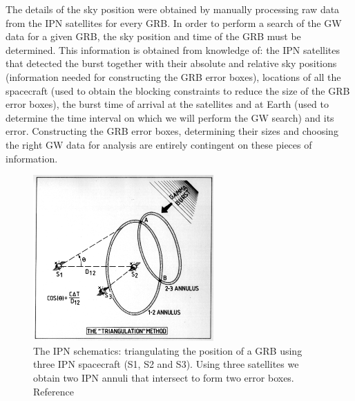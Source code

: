 \documentclass[a4paper]{jpconf}
\begin{document}
The details of the sky position were obtained by manually processing raw data from the IPN satellites for every GRB.  In order to perform a search of the GW data for a given GRB, the sky position and time of the GRB must be determined.  This information is obtained from knowledge of: the IPN satellites that detected the burst together with their absolute and relative sky positions (information needed for constructing the GRB error boxes), locations of all the spacecraft (used to obtain the blocking constraints to reduce the size of the GRB error boxes), the burst time of arrival at the satellites and at Earth (used to determine the time interval on which we will perform the GW search) and its error. Constructing the GRB error boxes, determining their sizes and choosing the right GW data for analysis are entirely contingent on these pieces of information.

\begin{figure}[htb]
\begin{center}
\includegraphics[height=15pc]{ipn1.pdf}
\caption{\label{fig:triangulation}The IPN schematics: triangulating the position of a GRB using three IPN spacecraft (S1, S2 and S3). Using three satellites we obtain two IPN annuli that intersect to form two error boxes. Reference \cite{HurleyHTML}}
\end{center}
\label{IPNtriangulation}
\end{figure}
\end{document}

